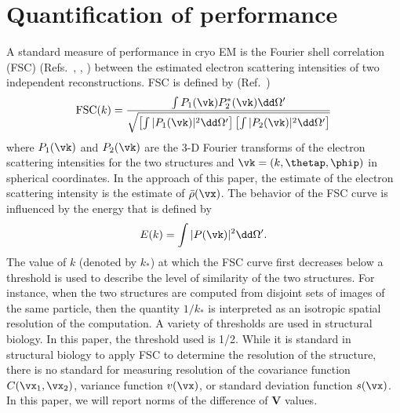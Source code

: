 \section{Quantification of performance}
A standard measure of performance in cryo EM is the Fourier shell
correlation (FSC) (Refs.~\cite[Eq.~2]{vanHeelUltramicroscopy1987},
\cite[Eq.~17]{HarauzvanHeelOptik1986},
\cite[p.~879]{BakerOlsonFullerMicrobiolMolBiolRev1999}) between the
estimated electron scattering intensities of two independent
reconstructions.
FSC is defined by
(Ref.~\cite[Eqs.~22--25]{YinZhengDoerschukNatarajanJohnsonJSB2003})
\begin{equation}
\mbox{FSC}(k)
=
\frac{
\int P_1(\vk) P_2^\ast(\vk) \dd\Omega^\prime
}{
\sqrt{
\left[\int |P_1(\vk)|^2 \dd\Omega^\prime\right]
\left[\int |P_2(\vk)|^2 \dd\Omega^\prime\right]
}
}
\label{eq:FSC:def}
\end{equation}
where $P_1(\vk)$ and $P_2(\vk)$ are the 3-D Fourier transforms of the
electron scattering intensities for the two structures and
$\vk=(k,\thetap,\phip)$ in spherical coordinates.
In the approach of this paper, the estimate of the electron scattering
intensity is the estimate of $\bar\rho(\vx)$.
The behavior of the FSC curve is influenced by the energy that
is defined by
\begin{equation}
E(k)
=
\int |P(\vk)|^2 \dd\Omega^\prime
\label{eq:Energy:def}
.
\end{equation}
The value of $k$ (denoted by $k_\ast$) at which the FSC curve first
decreases below a threshold is used to describe the level of similarity of
the two structures.
For instance, when the two structures are computed from disjoint sets of
images of the same particle, then the quantity $1/k_\ast$ is interpreted as an
isotropic spatial resolution of the computation.
A variety of thresholds are used in structural biology.
In this paper, the threshold used is 1/2.
While it is standard in structural biology to apply FSC to determine the
resolution of the structure,
there is no standard for measuring resolution of the covariance function
$\CrhoREAL(\vx_1,\vx_2)$, variance function $v(\vx)$, or
standard deviation function $s(\vx)$.
In this paper, we will report norms of the difference of $\mathbf{V}$
values.

